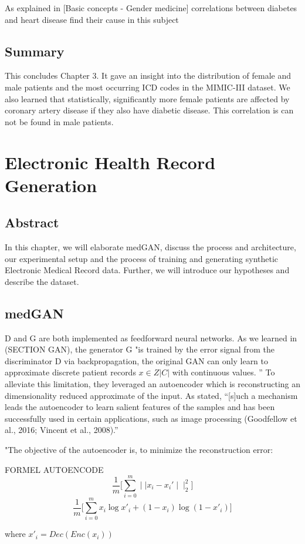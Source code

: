 \documentclass[11pt, a4paper]{book}
\begin{document}
As explained in [Basic concepts - Gender medicine] correlations between diabetes and heart disease find their cause in this subject

\section{Summary}
This concludes Chapter 3. It gave an insight into the distribution of female and male patients and the most occurring ICD codes in the MIMIC-III dataset. We also learned that statistically, significantly more female patients are affected by coronary artery disease if they also have diabetic disease. This correlation is can not be found in male patients.  

\chapter{Electronic Health Record Generation}
\section{Abstract}
In this chapter, we will elaborate medGAN, discuss the process and architecture, our experimental setup and the process of training and generating synthetic Electronic Medical Record data. Further, we will introduce our hypotheses and describe the dataset.
\section{medGAN}
D and G are both implemented as feedforward neural networks.
As we learned in (SECTION GAN), the generator G "is trained by the error signal from the discriminator D via backpropagation, the original GAN can only learn to approximate discrete patient records $x \in Z|C|$ with continuous values. ” \cite{Choi2017}
To alleviate this limitation, they leveraged an autoencoder which is reconstructing an dimensionality reduced approximate of the input. As \cite{Choi2017} stated, “[s]uch a mechanism leads the autoencoder to learn salient features of the samples and has been successfully used in certain applications, such as image processing (Goodfellow et al., 2016; Vincent et al., 2008).” 

"The objective of the autoencoder is, to minimize the reconstruction error:

FORMEL AUTOENCODE
\begin{equation}
\frac{1}{m}\big[\sum_{i=0}^m \mid\mid x_i - x_i'\mid\mid_2^2]
\end{equation}
\begin{equation}
\frac{1}{m}\big[\sum_{i=0}^m x_i \log x'_i + (1-x_i) \log (1-x'_i)]
\end{equation} 
\begin{center}
where $x'_i = Dec(Enc(x_i))$
\end{center}
\end{document}
